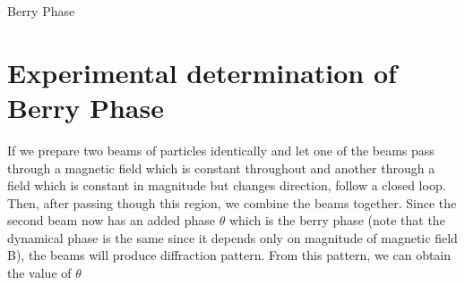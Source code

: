 \documentclass[12pt, oneside, listof=totoc,dvipsnames]{scrbook}
\begin{document}
\begin{chapter}{Berry Phase}
		\section{Experimental determination of Berry Phase}
		If we prepare two beams of particles identically and let one of the beams pass through a magnetic field which is constant throughout and another through a field which is constant in magnitude but changes direction, follow a closed loop. Then, after passing though this region, we combine the beams together. Since the second beam now has an added phase $\theta$ which is the berry phase (note that the dynamical phase is the same since it depends only on magnitude of magnetic field B), the beams will produce diffraction pattern. From this pattern, we can obtain the value of $\theta$ 
	\end{chapter}
	
	
	
	
	
	
	
	
	
	
	
	
	
	
	
	
	
\end{document}

